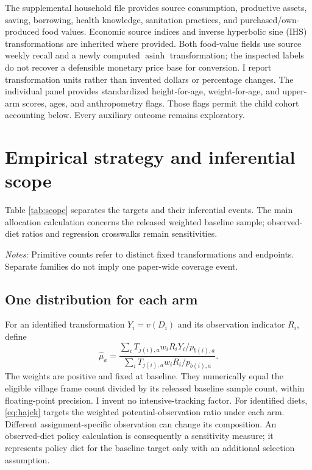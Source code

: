 \documentclass[11pt]{article}
\begin{document}
The supplemental household file provides source consumption, productive assets, saving, borrowing, health knowledge, sanitation practices, and purchased/own-produced food values. Economic source indices and inverse hyperbolic sine (IHS) transformations are inherited where provided. Both food-value fields use source weekly recall and a newly computed $\operatorname{asinh}$ transformation; the inspected labels do not recover a defensible monetary price base for conversion. I report transformation units rather than invented dollars or percentage changes. The individual panel provides standardized height-for-age, weight-for-age, and upper-arm scores, ages, and anthropometry flags. Those flags permit the child cohort accounting below. Every auxiliary outcome remains exploratory.

\section{Empirical strategy and inferential scope}

Table \ref{tab:scope} separates the targets and their inferential events. The main allocation calculation concerns the released weighted baseline sample; observed-diet ratios and regression crosswalks remain sensitivities.

\begin{table}[t]
\centering\caption{Targets, observation and inference}\label{tab:scope}
\small
\begin{minipage}{\textwidth}\footnotesize\emph{Notes:} Primitive counts refer to distinct fixed transformations and endpoints. Separate families do not imply one paper-wide coverage event.\end{minipage}
\end{table}


\subsection{One distribution for each arm}

For an identified transformation $Y_i=v(D_i)$ and its observation indicator $R_i$, define
\begin{equation}
 \widehat\mu_a=\frac{\sum_i T_{j(i),a}w_iR_iY_i/p_{b(i),a}}
 {\sum_i T_{j(i),a}w_iR_i/p_{b(i),a}}.\label{eq:hajek}
\end{equation}
The weights are positive and fixed at baseline. They numerically equal the eligible village frame count divided by its released baseline sample count, within floating-point precision. I invent no intensive-tracking factor. For identified diets, \eqref{eq:hajek} targets the weighted potential-observation ratio under each arm. Different assignment-specific observation can change its composition. An observed-diet policy calculation is consequently a sensitivity measure; it represents policy diet for the baseline target only with an additional selection assumption.
\end{document}
